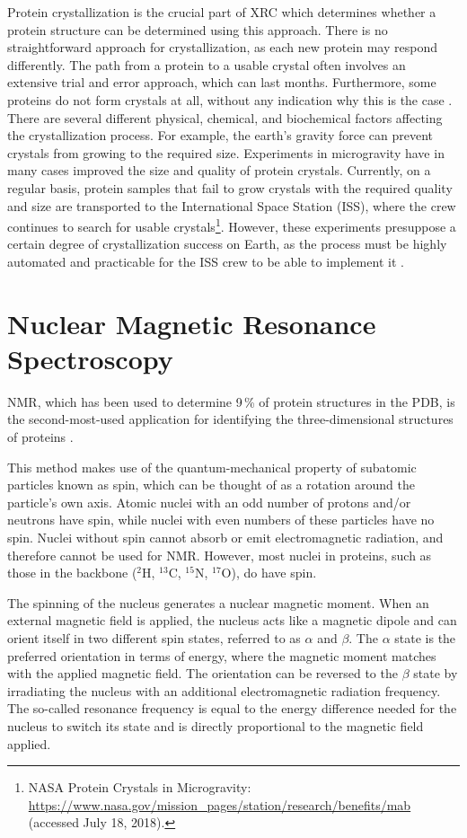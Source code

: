Protein crystallization is the crucial part of \ac{XRC} which determines whether a protein structure can be determined using this approach. There is no straightforward approach for crystallization, as each new protein may respond differently. The path from a protein to a usable crystal often involves an extensive trial and error approach, which can last months. Furthermore, some proteins do not form crystals at all, without any indication why this is the case 
\cite{McPherson.2014}. 
There are several different physical, chemical, and biochemical factors affecting the crystallization process. For example, the  earth's gravity force can prevent crystals from growing to the required size. Experiments in microgravity have in many cases improved the size and quality of protein crystals. Currently, on a regular basis, protein samples that fail to grow crystals with the required quality and size are transported to the International Space Station (ISS), where the crew continues to search for usable crystals\footnote{NASA Protein Crystals in Microgravity: \url{https://www.nasa.gov/mission_pages/station/research/benefits/mab} (accessed July 18, 2018).}. However, these experiments presuppose a certain degree of crystallization success on Earth, as the process must be highly automated and practicable for the ISS crew to be able to implement it  \cite{McPherson.2015}. 


\section{Nuclear Magnetic Resonance Spectroscopy}

\acf{NMR}, which has been used to determine 
9\,\% of protein structures in the \ac{PDB}, is the second-most-used application for identifying the \mbox{three-dimensional} structures of proteins  \cite{Burley.2018}.


This method makes use of the quantum-mechanical property of subatomic particles known as spin, which can be thought of as a rotation around the particle's own axis. Atomic nuclei with an odd number of protons and/or neutrons have spin, while nuclei with even numbers of these particles have no spin. Nuclei without spin cannot absorb or emit electromagnetic radiation, and therefore cannot be used for \ac{NMR}. However, most nuclei in proteins, such as those in the backbone ($^2$H, $^{13}$C, $^{15}$N, $^{17}$O), do have spin.

 The spinning of the nucleus generates a nuclear magnetic moment. When an external magnetic field is applied, the nucleus acts like a magnetic dipole and can orient itself in two different spin states, referred to as $\alpha$ and $\beta$. 
The $\alpha$ state is the preferred orientation in terms of energy, where the magnetic moment matches with the applied magnetic field. The orientation can be reversed to the $\beta$ state by irradiating the nucleus with an additional electromagnetic radiation frequency. The so-called resonance frequency is equal to the energy difference needed for the nucleus to switch its state and is directly proportional to the magnetic field applied.
 
